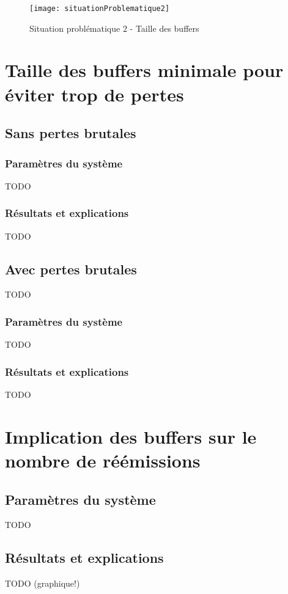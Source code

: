 \documentclass[a4paper,11pt]{article}
\begin{document}
\begin{figure}[h!t]
  \centering
    \texttt{[image: situationProblematique2]}
  \caption{Situation problématique 2 - Taille des buffers}
  \label{fig:situationproblematique12}
\end{figure}










\section{Taille des buffers minimale pour éviter trop de pertes}
\subsection{Sans pertes brutales}
\subsubsection{Paramètres du système}
TODO
\subsubsection{Résultats et explications}
TODO


\subsection{Avec pertes brutales}
TODO
\subsubsection{Paramètres du système}
TODO
\subsubsection{Résultats et explications}
TODO



\section{Implication des buffers sur le nombre de réémissions}
\subsection{Paramètres du système}
TODO

\subsection{Résultats et explications}
TODO (graphique!)
\end{document}

